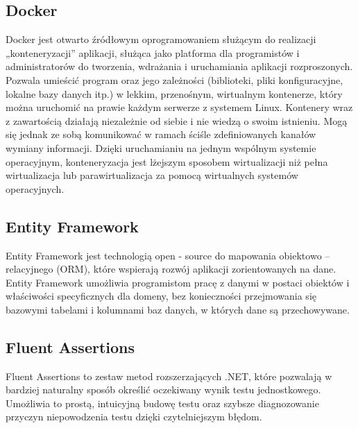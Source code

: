 \documentclass[12pt,a4paper]{article}
\begin{document}
		\subsection{Docker}
			\indent Docker jest otwarto źródłowym oprogramowaniem służącym do realizacji „konteneryzacji” aplikacji, służąca jako platforma dla programistów
				i administratorów do tworzenia, wdrażania i uruchamiania aplikacji rozproszonych. Pozwala umieścić program oraz jego zależności (biblioteki,
				pliki konfiguracyjne, lokalne bazy danych itp.) w lekkim, przenośnym, wirtualnym kontenerze, który można uruchomić na prawie każdym serwerze
				z systemem Linux. Kontenery wraz z zawartością działają niezależnie od siebie i nie wiedzą o swoim istnieniu. Mogą się jednak ze sobą
				komunikować w ramach ściśle zdefiniowanych kanałów wymiany informacji. Dzięki uruchamianiu na jednym wspólnym systemie operacyjnym,
				konteneryzacja jest lżejszym sposobem wirtualizacji niż pełna wirtualizacja lub parawirtualizacja za pomocą wirtualnych systemów
				operacyjnych.
				 	
		\subsection{Entity Framework}		 
		 	\indent Entity Framework jest technologią open - source do mapowania obiektowo – relacyjnego (ORM), które wspierają rozwój aplikacji zorientowanych na dane.
		 	Entity Framework umożliwia programistom pracę z danymi w postaci obiektów i właściwości specyficznych dla domeny, bez konieczności przejmowania się bazowymi
		 	tabelami i kolumnami baz danych, w których dane są przechowywane. 

		\subsection{Fluent Assertions}
			\indent Fluent Assertions to zestaw metod rozszerzających .NET, które pozwalają
			w bardziej naturalny sposób określić oczekiwany wynik testu jednostkowego.
			Umożliwia to prostą, intuicyjną budowę testu oraz szybsze diagnozowanie przyczyn
			niepowodzenia testu dzięki czytelniejszym błędom.
\end{document}
